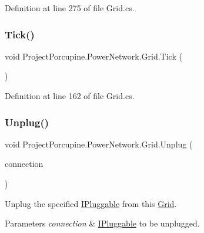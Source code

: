 Definition at line 275 of file Grid.\+cs.

\mbox{\label{class_project_porcupine_1_1_power_network_1_1_grid_ab371c7c2e99eee313277cd560e570418}} 
\subsubsection{\texorpdfstring{Tick()}{Tick()}}
{\footnotesize\ttfamily void Project\+Porcupine.\+Power\+Network.\+Grid.\+Tick (\begin{DoxyParamCaption}{ }\end{DoxyParamCaption})}



Definition at line 162 of file Grid.\+cs.

\mbox{\label{class_project_porcupine_1_1_power_network_1_1_grid_aa1b238cb717ad56a98c32890a2759e74}} 
\subsubsection{\texorpdfstring{Unplug()}{Unplug()}}
{\footnotesize\ttfamily void Project\+Porcupine.\+Power\+Network.\+Grid.\+Unplug (\begin{DoxyParamCaption}\item[{\hyperlink{interface_project_porcupine_1_1_power_network_1_1_i_pluggable}{I\+Pluggable}}]{connection }\end{DoxyParamCaption})}



Unplug the specified \hyperlink{interface_project_porcupine_1_1_power_network_1_1_i_pluggable}{I\+Pluggable} from this \hyperlink{class_project_porcupine_1_1_power_network_1_1_grid}{Grid}. 


\begin{DoxyParams}{Parameters}
{\em connection} & \hyperlink{interface_project_porcupine_1_1_power_network_1_1_i_pluggable}{I\+Pluggable} to be unplugged.\\
\hline
\end{DoxyParams}


